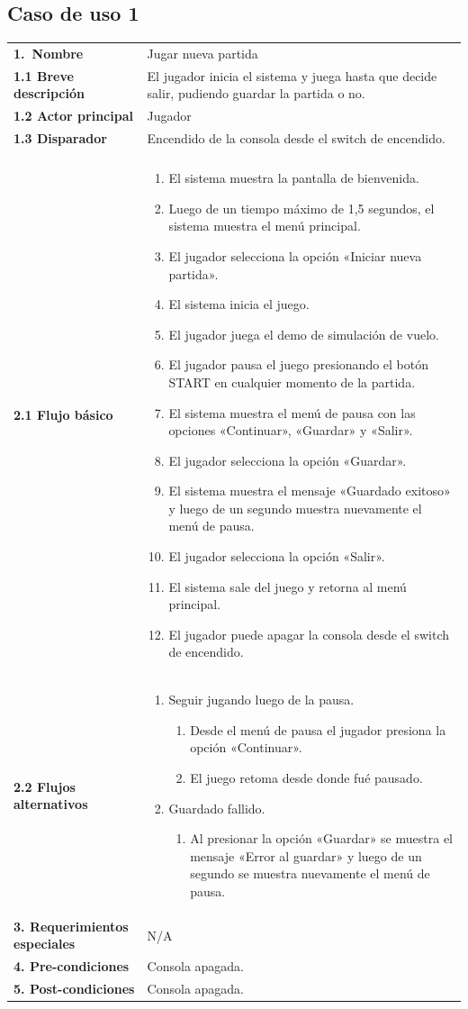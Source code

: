 \documentclass[11pt,a4paper]{article}
\makeatletter
\newcommand{\UseCaseTable}[9]{%
\begingroup
\renewcommand{\arraystretch}{1.2}
\noindent 
\rowcolors{3}{white}{white}%
\begin{tabularx}{\linewidth}{@{}|>{\raggedright\arraybackslash}p{4cm}|X|@{}}
\hline
\rowcolor[HTML]{0073A0}%
\multicolumn{2}{|c|}{\color{white}\bfseries #1}\\ \hline
\textbf{1.~Nombre} & #1\\ \hline
\textbf{1.1 Breve descripción} & #2\\ \hline
\textbf{1.2 Actor principal} & #3\\ \hline
\textbf{1.3 Disparador} & #4\\ \hline
\multicolumn{2}{|l|}{\textbf{2.~Flujo de eventos}} \\ \hline   %
\quad\textbf{2.1 Flujo básico} & #5\\ \hline
\quad\textbf{2.2 Flujos alternativos} & #6\\ \hline
\textbf{3. Requerimientos especiales} & #7\\ \hline
\textbf{4. Pre-condiciones} & #8\\ \hline
\textbf{5. Post-condiciones} & #9\\ \hline
\end{tabularx}
\endgroup
}
\makeatother
\begin{document}
\subsection{Caso de uso 1}
\UseCaseTable
  {Jugar nueva partida} %
  {El jugador inicia el sistema y juega hasta que decide salir, pudiendo guardar la partida o no.} %
  {Jugador}             %
  {Encendido de la consola desde el switch de encendido.} %
  {%
  \begin{enumerate}[leftmargin=*,nosep]
  \item El sistema muestra la pantalla de bienvenida.
  \item Luego de un tiempo máximo de 1,5 segundos, el sistema muestra el menú principal.
  \item El jugador selecciona la opción «Iniciar nueva partida».
  \item El sistema inicia el juego.
  \item El jugador juega el demo de simulación de vuelo.
  \item El jugador pausa el juego presionando el botón START en cualquier momento de la partida.
  \item El sistema muestra el menú de pausa con las opciones «Continuar», «Guardar» y «Salir».
  \item El jugador selecciona la opción «Guardar».
  \item El sistema muestra el mensaje «Guardado exitoso» y luego de un segundo muestra nuevamente el menú de pausa.
  \item El jugador selecciona la opción «Salir».
  \item El sistema sale del juego y retorna al menú principal.
  \item El jugador puede apagar la consola desde el switch de encendido.
  \end{enumerate}} %
  {%
  \begin{enumerate}[leftmargin=*,nosep]
    \item Seguir jugando luego de la pausa.
  \begin{enumerate}[leftmargin=*,nosep]
    \item Desde el menú de pausa el jugador presiona la opción «Continuar».
    \item El juego retoma desde donde fué pausado.
  \end{enumerate}
    \item Guardado fallido.
    \begin{enumerate}[leftmargin=*,nosep]
      \item Al presionar la opción «Guardar» se muestra el mensaje «Error al guardar» y luego de un segundo se muestra nuevamente el menú de pausa.
    \end{enumerate}
  \end{enumerate}} %
  {N/A} %
  {Consola apagada.}    %
  {Consola apagada.} %
\end{document}
